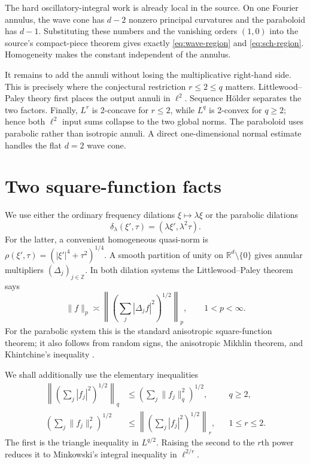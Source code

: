 \documentclass[11pt]{article}
\newcommand{\R}{\mathbb R}
\begin{document}
The hard oscillatory-integral work is already local in the source.  On one
Fourier annulus, the wave cone has $d-2$ nonzero principal curvatures and the
paraboloid has $d-1$.  Substituting these numbers and the vanishing orders
$(1,0)$ into the source's compact-piece theorem gives exactly
\eqref{eq:wave-region} and \eqref{eq:sch-region}.  Homogeneity makes the
constant independent of the annulus.

It remains to add the annuli without losing the multiplicative right-hand
side.  This is precisely where the conjectural restriction
$r\le2\le q$ matters.  Littlewood--Paley theory first places the output
annuli in $\ell^2$.  Sequence H\"older separates the two factors.  Finally,
$L^r$ is 2-concave for $r\le2$, while $L^q$ is 2-convex for $q\ge2$; hence
both $\ell^2$ input sums collapse to the two global norms.  The paraboloid
uses parabolic rather than isotropic annuli.  A direct one-dimensional
normal estimate handles the flat $d=2$ wave cone.

\section{Two square-function facts}

We use either the ordinary frequency dilations $\xi\mapsto\lambda\xi$ or the
parabolic dilations
\begin{equation}\label{eq:parabolic-dilation}
 \delta_\lambda(\xi',\tau)=(\lambda\xi',\lambda^2\tau).
\end{equation}
For the latter, a convenient homogeneous quasi-norm is
$\rho(\xi',\tau)=(|\xi'|^4+\tau^2)^{1/4}$.  A smooth partition of unity on
$\R^d\setminus\{0\}$ gives annular multipliers $(\Delta_j)_{j\in\mathbb Z}$.
In both dilation systems the Littlewood--Paley theorem says
\begin{equation}\label{eq:LP}
 \|f\|_p\asymp
 \left\|\left(\sum_j|\Delta_jf|^2\right)^{1/2}\right\|_p,
 \qquad 1<p<\infty.
\end{equation}
For the parabolic system this is the standard anisotropic square-function
theorem; it also follows from random signs, the anisotropic Mikhlin theorem,
and Khintchine's inequality \cite{Stein}.

We shall additionally use the elementary inequalities
\begin{align}
 \left\|\left(\sum_j|f_j|^2\right)^{1/2}\right\|_q
 &\le \left(\sum_j\|f_j\|_q^2\right)^{1/2}, &&q\ge2,
 \label{eq:2convex}\\
 \left(\sum_j\|f_j\|_r^2\right)^{1/2}
 &\le \left\|\left(\sum_j|f_j|^2\right)^{1/2}\right\|_r, &&1\le r\le2.
 \label{eq:2concave}
\end{align}
The first is the triangle inequality in $L^{q/2}$.  Raising the second to
the $r$th power reduces it to Minkowski's integral inequality in
$\ell^{2/r}$.
\end{document}
